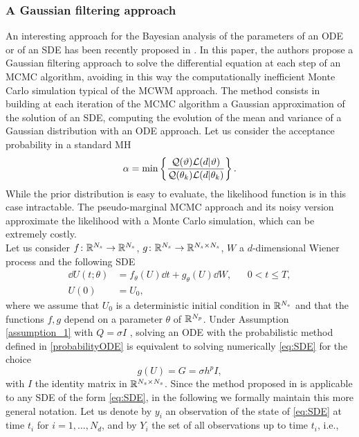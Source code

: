 \subsubsection{A Gaussian filtering approach}

An interesting approach for the Bayesian analysis of the parameters of an ODE or of an SDE has been recently proposed in \cite{SHM15}. In this paper, the authors propose a Gaussian filtering approach to solve the differential equation at each step of an MCMC algorithm, avoiding in this way the computationally inefficient Monte Carlo simulation typical of the MCWM approach. The method consists in building at each iteration of the MCMC algorithm a Gaussian approximation of the solution of an SDE, computing the evolution of the mean and variance of a Gaussian distribution with an ODE approach. Let us consider the acceptance probability in a standard MH
\begin{equation}
	\alpha = \min\left\{\frac{\mathcal Q(\vartheta) \mathcal{L}(d|\vartheta)}{\mathcal Q(\theta_k) \mathcal{L}(d|\theta_k)}\right\}.
\end{equation}
While the prior distribution is easy to evaluate, the likelihood function is in this case intractable. The pseudo-marginal MCMC approach and its noisy version approximate the likelihood with a Monte Carlo simulation, which can be extremely costly. \\
Let us consider $f\colon\mathbb{R}^{N_s}\to\mathbb{R}^{N_s}$, $g\colon\mathbb{R}^{N_s}\to\mathbb{R}^{N_s\times N_s}$, $W$ a $d$-dimensional Wiener process and the following SDE
\begin{equation}\label{eq:SDE}
\begin{aligned}
	\dd U(t; \theta) &= f_{\theta}(U) \dd t + g_{\theta}(U) \dd W, && 0 < t \leq T,\\
	U(0) &= U_0,
\end{aligned}
\end{equation}
where we assume that $U_0$ is a deterministic initial condition in $\mathbb{R}^{N_s}$ and that the functions $f,g$ depend on a parameter $\theta$ of $\mathbb{R}^{N_p}$. Under Assumption \ref{assumption_1} with $Q = \sigma I$ , solving an ODE with the probabilistic method defined in \eqref{probabilityODE} is equivalent to solving numerically \eqref{eq:SDE} for the choice
\begin{equation}
	g(U) = G = \sigma h^p I,
\end{equation}
with $I$ the identity matrix in $\mathbb{R}^{N_s\times N_s}$. Since the method proposed in \cite{SHM15} is applicable to any SDE of the form \eqref{eq:SDE}, in the following we formally maintain this more general notation. Let us denote by $y_i$ an observation of the state of \eqref{eq:SDE} at time $t_i$ for $i = 1, \ldots, N_d$, and by $Y_i$ the set of all observations up to time $t_i$, i.e.,

